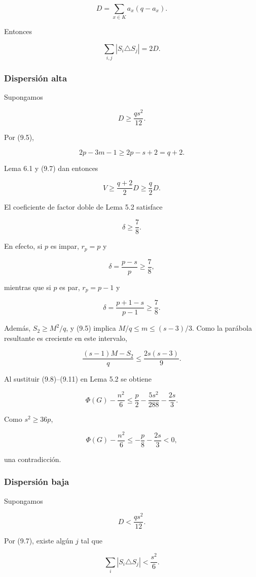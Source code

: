 \documentclass[
  spanish,
  11pt,
  a4paper,
]{article}
\begin{document}
\[
D=\sum_{x\in K}a_x(q-a_x).
\tag{9.6}
\]

Entonces

\[
\sum_{i,j}|S_i\triangle S_j|=2D.
\tag{9.7}
\]

\subsubsection{Dispersión alta}\label{dispersiuxf3n-alta}

Supongamos

\[
D\ge\frac{qs^2}{12}.
\tag{9.8}
\]

Por (9.5),

\[
2p-3m-1\ge2p-s+2=q+2.
\]

Lema 6.1 y (9.7) dan entonces

\[
V
\ge
\frac{q+2}{2}D
\ge
\frac q2D.
\tag{9.9}
\]

El coeficiente de factor doble de Lema 5.2 satisface

\[
\boxed{\delta\ge\frac78.}
\tag{9.10}
\]

En efecto, si \(p\) es impar, \(r_p=p\) y

\[
\delta=\frac{p-s}{p}\ge\frac78,
\]

mientras que si \(p\) es par, \(r_p=p-1\) y

\[
\delta=\frac{p+1-s}{p-1}\ge\frac78.
\]

Además, \(S_2\ge M^2/q\), y (9.5) implica \(M/q\le m\le(s-3)/3\). Como la parábola resultante es creciente en este intervalo,

\[
\frac{(s-1)M-S_2}{q}
\le
\frac{2s(s-3)}9.
\tag{9.11}
\]

Al sustituir (9.8)--(9.11) en Lema 5.2 se obtiene

\[
\Phi(G)-\frac{n^2}{6}
\le
\frac p2-\frac{5s^2}{288}-\frac{2s}{3}.
\tag{9.12}
\]

Como \(s^2\ge36p\),

\[
\Phi(G)-\frac{n^2}{6}
\le
-\frac p8-\frac{2s}{3}<0,
\]

una contradicción.

\subsubsection{Dispersión baja}\label{dispersiuxf3n-baja}

Supongamos

\[
D<\frac{qs^2}{12}.
\tag{9.13}
\]

Por (9.7), existe algún \(j\) tal que

\[
\sum_i|S_i\triangle S_j|
<
\frac{s^2}{6}.
\tag{9.14}
\]
\end{document}
